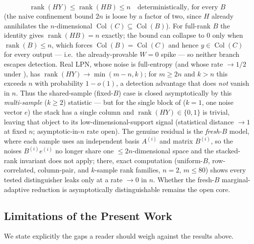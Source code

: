 \documentclass[11pt,a4paper]{article}
\theoremstyle{plain}
\theoremstyle{definition}
\begin{document}
\begin{enumerate}
\[
\operatorname{rank}(HY) \le \operatorname{rank}(HB) \le n \quad \text{deterministically, for every } B
\]
(the naive confinement bound $2n$ is loose by a factor of two, since $H$ already annihilates the $n$-dimensional $\operatorname{Col}(C)\subseteq\operatorname{Col}(B)$). For full-rank $B$ the identity gives $\operatorname{rank}(HB)=n$ exactly; the bound can collapse to $0$ only when $\operatorname{rank}(B)\le n$, which forces $\operatorname{Col}(B)=\operatorname{Col}(C)$ and hence $y\in\operatorname{Col}(C)$ for every output --- i.e.\ the already-provable $W=0$ spike --- so neither branch escapes detection. Real LPN, whose noise is full-entropy (and whose rate $\to 1/2$ under ), has $\operatorname{rank}(HY) \to \min(m-n, k)$; for $m \ge 2n$ and $k > n$ this exceeds $n$ with probability $1 - o(1)$, a detection advantage that does \emph{not} vanish in $n$. Thus the shared-sample (fixed-$B$) case is closed asymptotically by this \emph{multi-sample} ($k\ge 2$) statistic --- but for the single block of  ($k=1$, one noise vector $e$) the stack has a single column and $\operatorname{rank}(HY)\in\{0,1\}$ is trivial, leaving that object to its low-dimensional-support signal (statistical distance $\to 1$ at fixed $n$; asymptotic-in-$n$ rate open). The genuine residual is the \emph{fresh-$B$} model, where each sample uses an independent basis $A^{(i)}$ and matrix $B^{(i)}$, so the noises $B^{(i)}e^{(i)}$ no longer share one $\le 2n$-dimensional space and the stacked-rank invariant does not apply; there, exact computation (uniform-$B$, row-correlated, column-pair, and $k$-sample rank families, $n=2$, $m \le 80$) shows every tested distinguisher leaks only at a rate $\to 0$ in $n$. Whether the fresh-$B$ marginal-adaptive reduction is asymptotically distinguishable remains the open core.
\end{enumerate}

\subsection{Limitations of the Present Work}
\label{subsec:limitations}

We state explicitly the gaps a reader should weigh against the results above.
\end{document}
